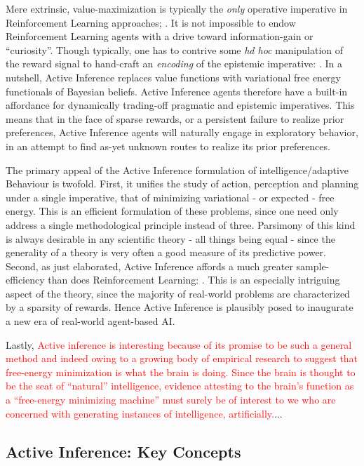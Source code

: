 \documentclass[onecolumn]{IEEEtran}
\begin{document}
Mere extrinsic, value-maximization is typically the \textit{only} operative imperative in Reinforcement Learning approaches; \textcite{Reinforcement-Learning-An-Introduction}. It is not impossible to endow Reinforcement Learning agents with a drive toward information-gain or ``curiosity''. Though typically, one has to contrive some \textit{hd hoc} manipulation of the reward signal to hand-craft an \textit{encoding} of the epistemic imperative: \textcite{Curiosity-Driven-RL}. In a nutshell, Active Inference replaces value functions with variational free energy functionals of Bayesian beliefs. Active Inference agents therefore have a built-in affordance for dynamically trading-off pragmatic and epistemic imperatives. This means that in the face of sparse rewards, or a persistent failure to realize prior preferences, Active Inference agents will naturally engage in exploratory behavior, in an attempt to find as-yet unknown routes to realize its prior preferences. 

The primary appeal of the Active Inference formulation of intelligence/adaptive Behaviour is twofold. First, it unifies the study of action, perception and planning under a single imperative, that of minimizing variational - or expected - free energy. This is an efficient formulation of these problems, since one need only address a single methodological principle instead of three. Parsimony of this kind is always desirable in any scientific theory - all things being equal - since the generality of a theory is very often a good measure of its predictive power. Second, as just elaborated, Active Inference affords a much greater sample-efficiency than does Reinforcement Learning: \textcite{Scaling-AIF}. This is an especially intriguing aspect of the theory, since the majority of real-world problems are characterized by a sparsity of rewards. Hence Active Inference is plausibly posed to inaugurate a new era of real-world agent-based AI.

Lastly, \textcolor{red}{Active inference is interesting because of its promise to be such a general method and indeed owing to a growing body of empirical research to suggest that free-energy minimization is what the brain is doing. Since the brain is thought to be the seat of ``natural'' intelligence, evidence attesting to the brain's function as a ``free-energy minimizing machine'' must surely be of interest to we who are concerned with generating instances of intelligence, artificially.}...

\subsection{Active Inference: Key Concepts} 
\end{document}
